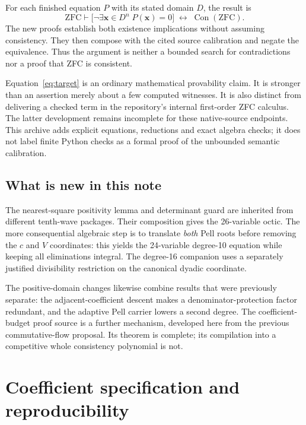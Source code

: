 \documentclass[11pt,letterpaper]{article}
\newcommand{\Con}{\operatorname{Con}}
\newcommand{\ZFC}{\mathrm{ZFC}}
\theoremstyle{definition}
\theoremstyle{remark}
\begin{document}
For each finished equation $P$ with its stated domain $D$, the result is
\begin{equation}
 \ZFC\vdash
 \bigl[\neg\exists\boldsymbol{x}\in D^n\;P(\boldsymbol{x})=0\bigr]
 \;\longleftrightarrow\;\Con(\ZFC).
 \label{eq:target}
\end{equation}
The new proofs establish both existence implications without assuming
consistency. They then compose with the cited source calibration and
negate the equivalence. Thus the argument is neither a bounded search
for contradictions nor a proof that ZFC is consistent.

Equation~\eqref{eq:target} is an ordinary mathematical provability claim.
It is stronger than an assertion merely about a few computed witnesses.
It is also distinct from delivering a checked term in the repository's
internal first-order ZFC calculus. The latter development remains
incomplete for these native-source endpoints\cite{objectzfc}. This archive
adds explicit equations, reductions and exact algebra checks; it does not
label finite Python checks as a formal proof of the unbounded semantic
calibration.

\subsection{What is new in this note}

The nearest-square positivity lemma and determinant guard are inherited
from different tenth-wave packages. Their composition gives the 26-variable
octic. The more consequential algebraic step is to translate \emph{both}
Pell roots before removing the $c$ and $V$ coordinates: this yields the
24-variable degree-10 equation while keeping all eliminations integral.
The degree-16 companion uses a separately justified divisibility restriction
on the canonical dyadic coordinate.

The positive-domain changes likewise combine results that were previously
separate: the adjacent-coefficient descent makes a denominator-protection
factor redundant, and the adaptive Pell carrier lowers a second degree.
The coefficient-budget proof source is a further mechanism, developed
here from the previous commutative-flow proposal. Its theorem is complete;
its compilation into a competitive whole consistency polynomial is not.





\section{Coefficient specification and reproducibility}
\label{sec:reproduce}
\end{document}
